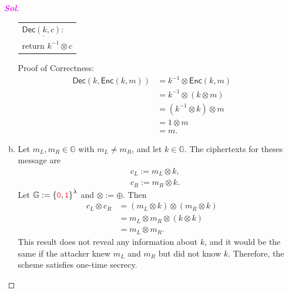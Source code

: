 \documentclass[12pt,openany]{book}
\theoremstyle{definition}
\newcommand{\set}[1]{\left\{#1\right\}}
\newcommand{\G}{\mathbb{G}}
\newcommand{\inv}[1]{#1^{-1}}
\newcommand{\sol}{\textcolor{magenta}{\bf Sol}}
\newcommand{\Enc}{\mathsf{Enc}}
\newcommand{\Dec}{\mathsf{Dec}}
\newcommand{\zero}{\textcolor{red}{\texttt{0}}}
\newcommand{\one}{\textcolor{red}{\texttt{1}}}
\newcommand{\tab}{\hspace{8pt}}
\newcommand{\xor}{\oplus}
\newcommand{\binaryfield}{\set{\zero,\one}}
\begin{document}
\begin{itemize}
\begin{tcolorbox}[colframe=magenta, breakable, enhanced]
\begin{proof}[\sol]
\begin{enumerate}[(a)]
\begin{center}
						\begin{tabular}{l}
							\(\underline{\Dec(k,c):}\) \\ \tab return \(\inv{k}\otimes c\)
						\end{tabular}
					\end{center}
					Proof of Correctness: \begin{align*}
						\Dec(k,\Enc(k,m))&=\inv{k}\otimes\Enc(k,m)\\
						&=\inv{k}\otimes(k\otimes m)\\
						&=(\inv{k}\otimes k)\otimes m\\
						&=1\otimes m\\
						&=m.
					\end{align*}
					\item Let $m_L,m_R\in\G$ with $m_L\neq m_R$, and let $k\in\G$. The ciphertexts for theses message are \begin{align*}
						&c_L:=m_L\otimes k,\\
						&c_R:=m_R\otimes k.
					\end{align*} Let $\G:=\binaryfield^\lambda$ and $\otimes:=\xor$. Then \begin{align*}
						c_L\otimes c_R&=(m_L\otimes k)\otimes(m_R\otimes k)\\
						&=m_L\otimes m_R\otimes(k\otimes k)\\
						&=m_L\otimes m_R.
					\end{align*} This result does not reveal any information about $k$, and it would be the same if the attacker knew $m_L$ and $m_R$ but did not know $k$. Therefore, the scheme satisfies one-time secrecy.
					

\end{enumerate}
\end{proof}
\end{tcolorbox}
\end{itemize}
\end{document}

